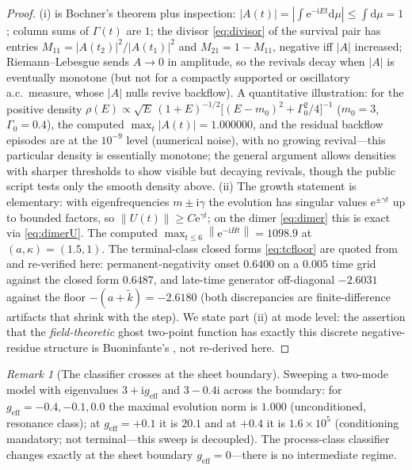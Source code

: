 \documentclass[11pt]{article}
\theoremstyle{definition}
\theoremstyle{remark}
\newtheorem{remark}[theorem]{Remark}
\newcommand{\ii}{\mathrm{i}}
\newcommand{\ee}{\mathrm{e}}
\newcommand{\dd}{\mathrm{d}}
\newcommand{\norm}[1]{\left\lVert #1 \right\rVert}
\newcommand{\wt}{\widetilde{k}}
\begin{document}
\begin{proof}
(i) is Bochner's theorem plus inspection:
$|A(t)|=|\int\ee^{-\ii Et}\dd\mu|\le\int\dd\mu=1$; column sums of
$\Gamma(t)$ are $1$; the divisor \eqref{eq:divisor} of the survival
pair has entries $M_{11}=|A(t_{2})|^{2}/|A(t_{1})|^{2}$ and
$M_{21}=1-M_{11}$, negative iff $|A|$ increased; Riemann--Lebesgue sends
$A\to0$ in amplitude, so the revivals decay when $|A|$ is eventually
monotone (but not for a compactly supported or oscillatory a.c.\ measure,
whose $|A|$ nulls revive backflow). A quantitative illustration: for the positive
density $\rho(E)\propto\sqrt{E}\,(1+E)^{-1/2}
\bigl[(E-m_{0})^{2}+\Gamma_{0}^{2}/4\bigr]^{-1}$
($m_{0}=3$, $\Gamma_{0}=0.4$), the computed
$\max_{t}|A(t)|=1.000000$, and the residual backflow episodes are at
the $10^{-9}$ level (numerical noise), with no growing revival---this particular density is
essentially monotone; the general argument allows densities with
sharper thresholds to show visible but decaying revivals, though the
public script tests only the smooth density above.
(ii) The growth statement is elementary: with eigenfrequencies
$m\pm\ii\gamma$ the evolution has singular values
$\ee^{\pm\gamma t}$ up to bounded factors, so
$\norm{U(t)}\ge C\ee^{\gamma t}$; on the dimer \eqref{eq:dimer} this
is exact via \eqref{eq:dimerU}. The computed
$\max_{t\le6}\norm{\ee^{-\ii Ht}}=1098.9$ at
$(a,\kappa)=(1.5,1)$. The terminal-class closed forms
\eqref{eq:tcfloor} are quoted from \cite{indivisible} and re-verified
here: permanent-negativity onset $0.6400$ on a $0.005$ time grid
against the closed form $0.6487$, and late-time generator
off-diagonal $-2.6031$ against the floor $-(a+\wt)=-2.6180$ (both
discrepancies are finite-difference artifacts that shrink with the
step). We state part (ii) at mode level: the assertion that the
\emph{field-theoretic} ghost two-point function has exactly this
discrete negative-residue structure is Buoninfante's
\cite[Eqs.~(40),(44)]{BuoninfanteP3}, not re-derived here.
\end{proof}

\begin{remark}[The classifier crosses at the sheet boundary]
Sweeping a two-mode model with eigenvalues $3+\ii g_{\mathrm{eff}}$
and $3-0.4\ii$ across the boundary: for
$g_{\mathrm{eff}}=-0.4,-0.1,0.0$ the maximal evolution norm is
$1.000$ (unconditioned, resonance class); at
$g_{\mathrm{eff}}=+0.1$ it is $20.1$ and at $+0.4$ it is
$1.6\times10^{5}$ (conditioning mandatory; not terminal---this sweep is
decoupled). The
process-class classifier changes exactly at the sheet boundary
$g_{\mathrm{eff}}=0$---there is no intermediate regime.
\end{remark}
\end{document}

